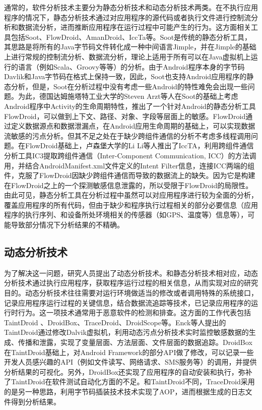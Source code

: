 通常的，软件分析技术主要分为静态分析技术和动态分析技术两类。在不执行应用程序的情况下，静态分析技术通过对应用程序的源代码或者执行文件进行控制流分析和数据流分析，进而推断应用程序在运行过程中可能产生的行为。这方面相关工具包括Soot、FlowDroid、AmanDroid、IccTa等。Soot是传统的静态分析工具，其思路是将所有的Java字节码文件转化成一种中间语言Jimple，并在Jimple的基础上进行常规的控制流分析、数据流分析，理论上适用于所有可以在Java虚拟机上运行的语言（例如Scala、Groovy等等）的分析。由于Android程序本身的字节码Davlik和Java字节码在格式上保持一致，因此，Soot也支持Android应用程序的静态分析，但是，Soot在分析过程中没有考虑一些Android的特性难免会出现一些问题。为此，德国达姆施塔特工业大学的Steven Arzt等人在Soot的基础上考虑Android程序中Activity的生命周期特性，推出了一个针对Android的静态分析工具FlowDroid，可以做到上下文、路径、对象、字段等层面上的敏感。FlowDroid通过定义数据源点和数据泄漏点，在Android应用生命周期的基础上，可以实现数据流敏感的污点分析。但其不足之处在于缺少跨组件通信的分析不考虑多线程调用问题。在FlowDroid基础上，卢森堡大学的Li Li等人推出了IccTA，利用跨组件通信分析工具IC3提取跨组件通信（Inter-Component Communication, ICC）的方法调用，并结合AndroidManifest.xml文件定义的Intent Filter信息，连接ICC两端的组件，克服了FlowDroid因缺少跨组件通信而导致的数据流上的缺失。因为它是构建在FlowDroid之上的一个探测敏感信息泄露的，所以受限于FlowDroid的局限性。由此可见，静态分析工具在分析过程中虽然可以对应用程序进行较为全面的分析，覆盖应用程序的所有代码，但由于缺少和程序执行过程相关的部分必要信息（应用程序的执行序列、和设备所处环境相关的传感器（如GPS、温度等）信息等），可能导致部分情况下分析结果的不精确。


\subsection{动态分析技术}

为了解决这一问题，研究人员提出了动态分析技术。和静态分析技术相对应，动态分析技术通过执行应用程序，获取程序运行过程的相关信息，从而实现对应的研究目的。动态分析技术往往需要对运行环境做适当的修改或者调用特殊的系统接口，记录应用程序运行过程的关键信息，结合数据流追踪等技术，已记录应用程序的运行时行为。这一项技术通常用于恶意软件的检测和排查。这方面的工作代表包括TaintDroid 、DroidBox、TraceDroid、DroidScope等。Enck等人提出的TaintDroid通过修改Dalvik虚拟机，利用动态污点分析技术实时监控敏感数据的生成、传播和泄露，实现了变量层面、方法层面、文件层面的数据追踪。DroidBox在TaintDroid基础上，对Android Framework的部分API做了修改，可以记录一些开发人员感兴趣的API（例如文件读写、网络请求、SMS服务等）的调用，并提供分析结果的可视化。另外，DroidBox还实现了应用程序的自动安装和执行，弥补了TaintDroid在软件测试自动化方面的不足。和TaintDroid不同，TraceDroid采用的是另一种思路，利用字节码插装技术技术实现了AOP，进而根据生成的日志文件得到分析结果。

